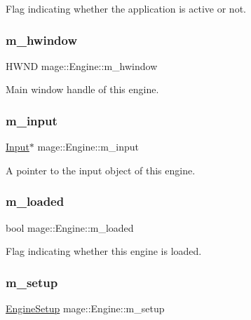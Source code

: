 Flag indicating whether the application is active or not. \hypertarget{classmage_1_1_engine_a1dda09f0ed656180f926616a0d3f95f1}{}\label{classmage_1_1_engine_a1dda09f0ed656180f926616a0d3f95f1} 
\subsubsection{\texorpdfstring{m\+\_\+hwindow}{m\_hwindow}}
{\footnotesize\ttfamily H\+W\+ND mage\+::\+Engine\+::m\+\_\+hwindow\hspace{0.3cm}{\ttfamily [private]}}

Main window handle of this engine. \hypertarget{classmage_1_1_engine_a432ac639c593fd0fb8cede2463fe10c2}{}\label{classmage_1_1_engine_a432ac639c593fd0fb8cede2463fe10c2} 
\subsubsection{\texorpdfstring{m\+\_\+input}{m\_input}}
{\footnotesize\ttfamily \hyperlink{classmage_1_1_input}{Input}$\ast$ mage\+::\+Engine\+::m\+\_\+input\hspace{0.3cm}{\ttfamily [private]}}

A pointer to the input object of this engine. \hypertarget{classmage_1_1_engine_a2f8783761b9629dd507d0a6bc456125b}{}\label{classmage_1_1_engine_a2f8783761b9629dd507d0a6bc456125b} 
\subsubsection{\texorpdfstring{m\+\_\+loaded}{m\_loaded}}
{\footnotesize\ttfamily bool mage\+::\+Engine\+::m\+\_\+loaded\hspace{0.3cm}{\ttfamily [private]}}

Flag indicating whether this engine is loaded. \hypertarget{classmage_1_1_engine_a4a16598b741fa040600b45a277d38233}{}\label{classmage_1_1_engine_a4a16598b741fa040600b45a277d38233} 
\subsubsection{\texorpdfstring{m\+\_\+setup}{m\_setup}}
{\footnotesize\ttfamily \hyperlink{structmage_1_1_engine_setup}{Engine\+Setup} mage\+::\+Engine\+::m\+\_\+setup\hspace{0.3cm}{\ttfamily [private]}}


